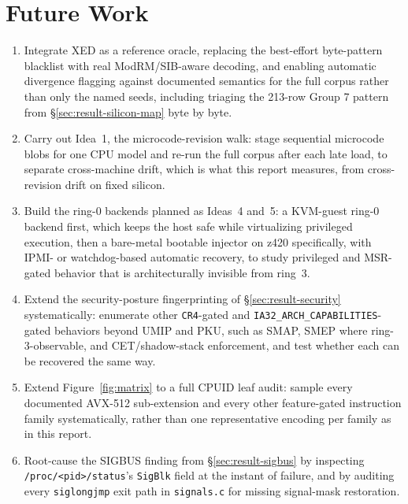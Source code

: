 \documentclass[11pt]{article}
\newcommand{\code}[1]{\texttt{#1}}
\begin{document}
\section{Future Work}
\label{sec:future}

\begin{enumerate}
  \item Integrate XED as a reference oracle, replacing the best-effort
    byte-pattern blacklist with real ModRM/SIB-aware decoding, and
    enabling automatic divergence flagging against documented semantics
    for the full corpus rather than only the named seeds, including
    triaging the 213-row Group 7 pattern from
    \S\ref{sec:result-silicon-map} byte by byte.
  \item Carry out Idea~1, the microcode-revision walk: stage sequential
    microcode blobs for one CPU model and re-run the full corpus after
    each late load, to separate cross-machine drift, which is what this
    report measures, from cross-revision drift on fixed silicon.
  \item Build the ring-0 backends planned as Ideas~4 and~5: a KVM-guest
    ring-0 backend first, which keeps the host safe while virtualizing
    privileged execution, then a bare-metal bootable injector on z420
    specifically, with IPMI- or watchdog-based automatic recovery, to
    study privileged and MSR-gated behavior that is architecturally
    invisible from ring~3.
  \item Extend the security-posture fingerprinting of
    \S\ref{sec:result-security} systematically: enumerate other
    \code{CR4}-gated and \code{IA32\_ARCH\_CAPABILITIES}-gated behaviors
    beyond UMIP and PKU, such as SMAP, SMEP where ring-3-observable, and
    CET/shadow-stack enforcement, and test whether each can be recovered
    the same way.
  \item Extend Figure~\ref{fig:matrix} to a full CPUID leaf audit:
    sample every documented AVX-512 sub-extension and every other
    feature-gated instruction family systematically, rather than one
    representative encoding per family as in this report.
  \item Root-cause the SIGBUS finding from \S\ref{sec:result-sigbus} by
    inspecting \code{/proc/<pid>/status}'s \code{SigBlk} field at the
    instant of failure, and by auditing every \code{siglongjmp} exit
    path in \code{signals.c} for missing signal-mask restoration.
\end{enumerate}
\end{document}
